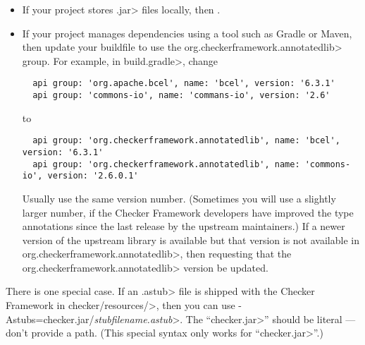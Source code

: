 \begin{itemize}
\item
If your project stores \<.jar> files locally, then
.

\item
If your project manages dependencies using a tool such as Gradle or Maven,
then update your buildfile to use the \<org.checkerframework.annotatedlib>
group.  For example, in \<build.gradle>, change

\begin{Verbatim}
  api group: 'org.apache.bcel', name: 'bcel', version: '6.3.1'
  api group: 'commons-io', name: 'commans-io', version: '2.6'
\end{Verbatim}

\noindent
to

\begin{Verbatim}
  api group: 'org.checkerframework.annotatedlib', name: 'bcel', version: '6.3.1'
  api group: 'org.checkerframework.annotatedlib', name: 'commons-io', version: '2.6.0.1'
\end{Verbatim}

\noindent
Usually use the same version number.  (Sometimes you will use a slightly larger
number, if the Checker Framework developers have improved the type
annotations since the last release by the upstream maintainers.)  If a
newer version of the upstream library is available but that version is not
available in \<org.checkerframework.annotatedlib>, then
 requesting that the
\<org.checkerframework.annotatedlib> version be updated.
\end{itemize}


There is one special case.  If an \<.astub> file is shipped with the
Checker Framework in \<checker/resources/>, then you can
use \<-Astubs=checker.jar/\emph{stubfilename.astub}>.
The ``\<checker.jar>'' should be literal --- don't provide a path.
(This special syntax only works for ``\<checker.jar>''.)



